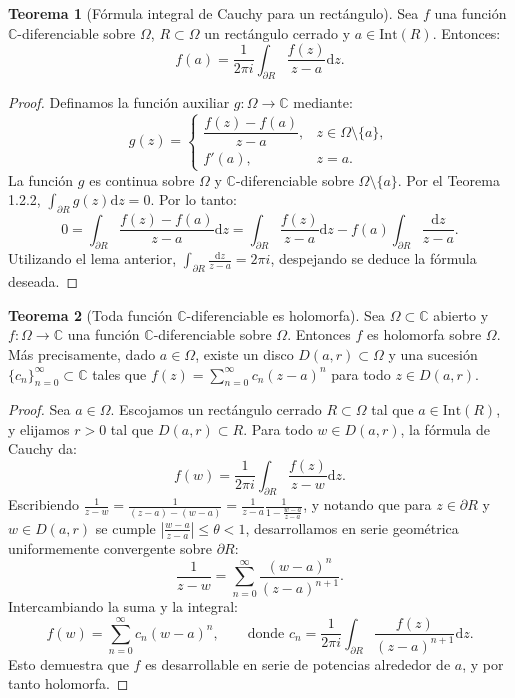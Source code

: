 \documentclass[11pt,a4paper]{article}
\theoremstyle{definition}
\newtheorem{teorema}{Teorema}[section]
\theoremstyle{remark}
\numberwithin{equation}{section}
\newcommand{\dz}{\mathrm{d}z}
\begin{document}
\begin{teorema}[Fórmula integral de Cauchy para un rectángulo]
Sea $f$ una función $\mathbb{C}$-diferenciable sobre $\Omega$, $R \subset \Omega$ un rectángulo cerrado y $a \in \mathrm{Int}(R)$. Entonces:
\begin{equation}
f(a) = \frac{1}{2\pi i} \int_{\partial R} \frac{f(z)}{z-a} \dz.
\end{equation}
\end{teorema}
\begin{proof}
Definamos la función auxiliar $g: \Omega \to \mathbb{C}$ mediante:
\[
g(z) = \begin{cases} \dfrac{f(z) - f(a)}{z-a}, & z \in \Omega \setminus \{a\}, \\ f'(a), & z = a. \end{cases}
\]
La función $g$ es continua sobre $\Omega$ y $\mathbb{C}$-diferenciable sobre $\Omega \setminus \{a\}$. Por el Teorema 1.2.2, $\int_{\partial R} g(z) \dz = 0$. Por lo tanto:
\[
0 = \int_{\partial R} \frac{f(z) - f(a)}{z-a} \dz = \int_{\partial R} \frac{f(z)}{z-a} \dz - f(a) \int_{\partial R} \frac{\dz}{z-a}.
\]
Utilizando el lema anterior, $\int_{\partial R} \frac{\dz}{z-a} = 2\pi i$, despejando se deduce la fórmula deseada.
\end{proof}

\begin{teorema}[Toda función $\mathbb{C}$-diferenciable es holomorfa]
Sea $\Omega \subset \mathbb{C}$ abierto y $f: \Omega \to \mathbb{C}$ una función $\mathbb{C}$-diferenciable sobre $\Omega$. Entonces $f$ es holomorfa sobre $\Omega$. Más precisamente, dado $a \in \Omega$, existe un disco $D(a,r) \subset \Omega$ y una sucesión $\{c_n\}_{n=0}^\infty \subset \mathbb{C}$ tales que $f(z) = \sum_{n=0}^\infty c_n (z-a)^n$ para todo $z \in D(a,r)$.
\end{teorema}
\begin{proof}
Sea $a \in \Omega$. Escojamos un rectángulo cerrado $R \subset \Omega$ tal que $a \in \mathrm{Int}(R)$, y elijamos $r > 0$ tal que $D(a,r) \subset R$. Para todo $w \in D(a,r)$, la fórmula de Cauchy da:
\[
f(w) = \frac{1}{2\pi i} \int_{\partial R} \frac{f(z)}{z-w} \dz.
\]
Escribiendo $\frac{1}{z-w} = \frac{1}{(z-a) - (w-a)} = \frac{1}{z-a} \frac{1}{1 - \frac{w-a}{z-a}}$, y notando que para $z \in \partial R$ y $w \in D(a,r)$ se cumple $\left|\frac{w-a}{z-a}\right| \le \theta < 1$, desarrollamos en serie geométrica uniformemente convergente sobre $\partial R$:
\[
\frac{1}{z-w} = \sum_{n=0}^\infty \frac{(w-a)^n}{(z-a)^{n+1}}.
\]
Intercambiando la suma y la integral:
\[
f(w) = \sum_{n=0}^\infty c_n (w-a)^n, \qquad \text{donde } c_n = \frac{1}{2\pi i} \int_{\partial R} \frac{f(z)}{(z-a)^{n+1}} \dz.
\]
Esto demuestra que $f$ es desarrollable en serie de potencias alrededor de $a$, y por tanto holomorfa.
\end{proof}
\end{document}

